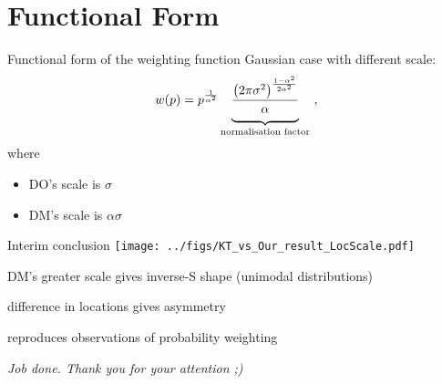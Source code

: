 \section{Functional Form}
\begin{frame}{Functional form of the weighting function}
Gaussian case with different scale:
\begin{equation}
	w(p) =
	p^{\frac{1}{\alpha^2}}
	\underbrace{
	\frac{\left(2\pi\sigma^2\right)^{\frac{1-\alpha^2}{2\alpha^2}}}{\alpha\strut}
	}_{\text{normalisation factor}}
	~,
\end{equation}
where
\begin{itemize}
  \item DO's scale is $\sigma$
  \item DM's scale is $\alpha\sigma$
\end{itemize}
\end{frame}




\begin{frame}{Interim conclusion}
\label{InterimConclusion}
\centering \texttt{[image: ../figs/KT\_vs\_Our\_result\_LocScale.pdf]}

\bi
	\item DM's greater scale gives inverse-S shape (unimodal distributions)
	\item difference in locations gives asymmetry
	\item reproduces observations of probability weighting
	\item[]
	\item[] \textit{Job done. Thank you for your attention ;)}
\ei
\end{frame}


